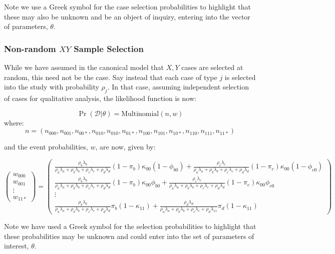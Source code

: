 \documentclass[12pt,]{book}
\begin{document}
Note we use a Greek symbol for the case selection probabilities to highlight that these may also be unknown and be an object of inquiry, entering into the vector of parameters, \(\theta\).

\subsubsection{Non-random $XY$ Sample Selection}\label{nonrandomcase}

While we have assumed in the canonical model that \(X,Y\) cases are selected at random, this need not be the case. Say instead that each case of type \(j\) is selected into the study with probability \(\rho_j\). In that case, assuming independent selection of cases for qualitative analysis, the likelihood function is now:

\[\Pr(\mathcal{D}|\theta) = {\text{Multinomial}}(n, w)\]
where: \[n = (n_{000}, n_{001},n_{00*},n_{010}, n_{010},n_{01*}, n_{100}, n_{101},n_{10*},n_{110},n_{111} ,n_{11*})\]

and the event probabilities, \(w\), are now, given by:

\[\left( \begin{array}{c}
w_{000} \\ w_{001} \\  \vdots \\ w_{11*}
\end{array} \right)=
\left( \begin{array}{c}
\frac{\rho_b \lambda_b}{\rho_a \lambda_a+\rho_b \lambda_b+\rho_c \lambda_c+\rho_d \lambda_d}(1-\pi_b)\kappa_{00}(1-\phi_{b0}) +
\frac{\rho_c \lambda_c}{\rho_a \lambda_a+\rho_b \lambda_b+\rho_c \lambda_c+\rho_d \lambda_d}(1-\pi_c)\kappa_{00}(1-\phi_{c0})\\
\frac{\rho_b \lambda_b}{\rho_a \lambda_a+\rho_b \lambda_b+\rho_c \lambda_c+\rho_d \lambda_d}(1-\pi_b)\kappa_{00}\phi_{b0}+
\frac{\rho_c \lambda_c}{\rho_a \lambda_a+\rho_b \lambda_b+\rho_c \lambda_c+\rho_d \lambda_d}(1-\pi_c)\kappa_{00}\phi_{c0}\\
\vdots \\
\frac{\rho_b \lambda_b}{\rho_a \lambda_a+\rho_b \lambda_b+\rho_c \lambda_c+\rho_d \lambda_d}\pi_{b}(1-\kappa_{11})+
\frac{\rho_d \lambda_d}{\rho_a \lambda_a+\rho_b \lambda_b+\rho_c \lambda_c+\rho_d \lambda_{11}}\pi_{d}(1-\kappa_{11})
\end{array} \right)\]

Note we have used a Greek symbol for the selection probabilities to highlight that these probabilities may be unknown and could enter into the set of parameters of interest, \(\theta\).
\end{document}
